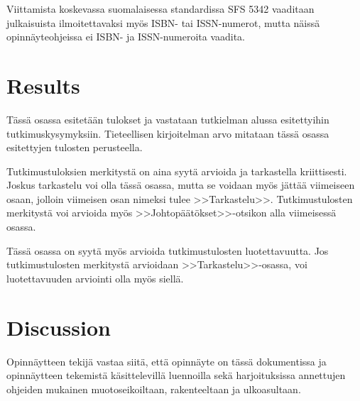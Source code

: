 \documentclass[english,12pt,a4paper,pdftex,elec,utf8]{aaltothesis}
\begin{document}
Viittamista koskevassa suomalaisessa standardissa
SFS 5342 \cite{sfs} vaaditaan julkaisuista ilmoitettavaksi my\"os ISBN- tai
ISSN-numerot, mutta n\"aiss\"a opinn\"ayteohjeissa ei ISBN- ja
ISSN-numeroita vaadita.

\clearpage

\section{Results}

T\"ass\"a osassa esitet\"a\"an tulokset ja vastataan tutkielman alussa
esitettyihin tutkimuskysymyksiin. Tieteellisen kirjoitelman
arvo mitataan t\"ass\"a osassa esitettyjen tulosten perusteella.

Tutkimustuloksien merkityst\"a on aina syyt\"a arvioida ja tarkastella
kriittisesti.  Joskus tarkastelu voi olla t\"ass\"a osassa, mutta se
voidaan my\"os j\"att\"a\"a viimeiseen osaan, jolloin viimeisen osan nimeksi
tulee >>Tarkastelu>>. Tutkimustulosten merkityst\"a voi arvioida my\"os
>>Johtop\"a\"at\"okset>>-otsikon alla viimeisess\"a osassa.

T\"ass\"a osassa on syyt\"a my\"os arvioida tutkimustulosten luotettavuutta.
Jos tutkimustulosten merkityst\"a arvioidaan >>Tarkastelu>>-osassa,
voi luotettavuuden arviointi olla my\"os siell\"a.

\clearpage

\section{Discussion}

Opinn\"aytteen tekij\"a vastaa siit\"a, ett\"a opinn\"ayte on t\"ass\"a dokumentissa
ja opinn\"aytteen tekemist\"a k\"asittelevill\"a luennoilla sek\"a
harjoituksissa annettujen ohjeiden mukainen muotoseikoiltaan,
rakenteeltaan ja ulkoasultaan.

\clearpage

{}


\end{document}
